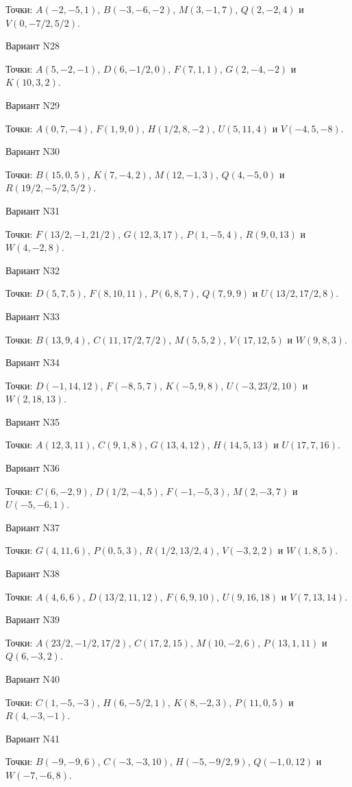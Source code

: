 \documentclass[11pt]{report}
\begin{document}
Точки: $A(-2, -5, 1)$, $B(-3, -6, -2)$, $M(3, -1, 7)$, $Q(2, -2, 4)$ и $V(0, -7/2, 5/2)$.

Вариант N28

Точки: $A(5, -2, -1)$, $D(6, -1/2, 0)$, $F(7, 1, 1)$, $G(2, -4, -2)$ и $K(10, 3, 2)$.

Вариант N29

Точки: $A(0, 7, -4)$, $F(1, 9, 0)$, $H(1/2, 8, -2)$, $U(5, 11, 4)$ и $V(-4, 5, -8)$.

Вариант N30

Точки: $B(15, 0, 5)$, $K(7, -4, 2)$, $M(12, -1, 3)$, $Q(4, -5, 0)$ и $R(19/2, -5/2, 5/2)$.

Вариант N31

Точки: $F(13/2, -1, 21/2)$, $G(12, 3, 17)$, $P(1, -5, 4)$, $R(9, 0, 13)$ и $W(4, -2, 8)$.

Вариант N32

Точки: $D(5, 7, 5)$, $F(8, 10, 11)$, $P(6, 8, 7)$, $Q(7, 9, 9)$ и $U(13/2, 17/2, 8)$.

Вариант N33

Точки: $B(13, 9, 4)$, $C(11, 17/2, 7/2)$, $M(5, 5, 2)$, $V(17, 12, 5)$ и $W(9, 8, 3)$.

Вариант N34

Точки: $D(-1, 14, 12)$, $F(-8, 5, 7)$, $K(-5, 9, 8)$, $U(-3, 23/2, 10)$ и $W(2, 18, 13)$.

Вариант N35

Точки: $A(12, 3, 11)$, $C(9, 1, 8)$, $G(13, 4, 12)$, $H(14, 5, 13)$ и $U(17, 7, 16)$.

Вариант N36

Точки: $C(6, -2, 9)$, $D(1/2, -4, 5)$, $F(-1, -5, 3)$, $M(2, -3, 7)$ и $U(-5, -6, 1)$.

Вариант N37

Точки: $G(4, 11, 6)$, $P(0, 5, 3)$, $R(1/2, 13/2, 4)$, $V(-3, 2, 2)$ и $W(1, 8, 5)$.

Вариант N38

Точки: $A(4, 6, 6)$, $D(13/2, 11, 12)$, $F(6, 9, 10)$, $U(9, 16, 18)$ и $V(7, 13, 14)$.

Вариант N39

Точки: $A(23/2, -1/2, 17/2)$, $C(17, 2, 15)$, $M(10, -2, 6)$, $P(13, 1, 11)$ и $Q(6, -3, 2)$.

Вариант N40

Точки: $C(1, -5, -3)$, $H(6, -5/2, 1)$, $K(8, -2, 3)$, $P(11, 0, 5)$ и $R(4, -3, -1)$.

Вариант N41

Точки: $B(-9, -9, 6)$, $C(-3, -3, 10)$, $H(-5, -9/2, 9)$, $Q(-1, 0, 12)$ и $W(-7, -6, 8)$.
\end{document}
